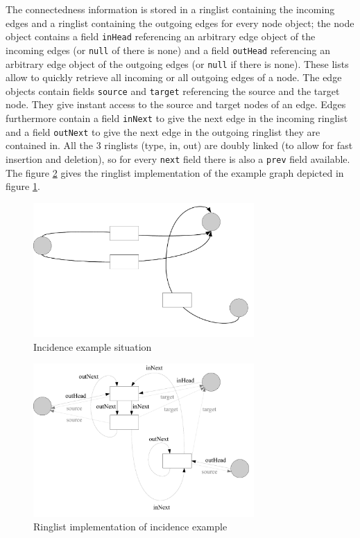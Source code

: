 The connectedness information is stored in a ringlist containing the incoming edges and a ringlist containing the outgoing edges for every node object; the node object contains a field \texttt{inHead} referencing an arbitrary edge object of the incoming edges (or \texttt{null} of there is none) and a field \texttt{outHead} referencing an arbitrary edge object of the outgoing edges (or \texttt{null} if there is none).
These lists allow to quickly retrieve all incoming or all outgoing edges of a node.
The edge objects contain fields \texttt{source} and \texttt{target} referencing the source and the target node.
They give instant access to the source and target nodes of an edge.
Edges furthermore contain a field \texttt{inNext} to give the next edge in the incoming ringlist and a field \texttt{outNext} to give the next edge in the outgoing ringlist they are contained in.
All the 3 ringlists (type, in, out) are doubly linked (to allow for fast insertion and deletion), so for every \texttt{next} field there is also a \texttt{prev} field available.
The figure \ref{figincidenceexampleringlists} gives the ringlist implementation of the example graph depicted in figure \ref{figincidenceexample}. 

\begin{figure}[htbp]
  \centering
  \includegraphics[width=0.75\textwidth]{fig/IncidenceExample}
  \caption{Incidence example situation}
  \label{figincidenceexample}
\end{figure}

\begin{figure}[htbp]
  \centering
  \includegraphics[width=0.75\textwidth]{fig/IncidenceExampleRinglists}
  \caption{Ringlist implementation of incidence example}
  \label{figincidenceexampleringlists}
\end{figure}


